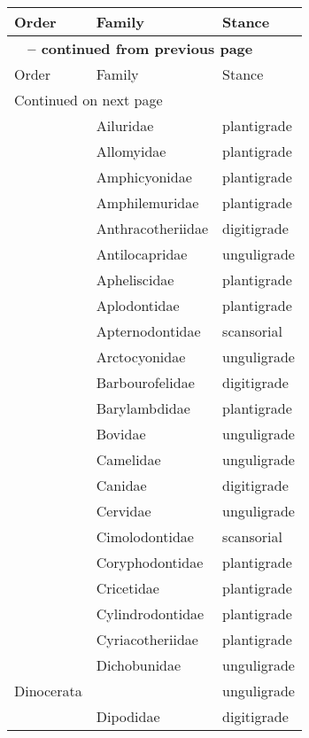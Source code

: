 
\begin{center}
  \begin{longtable}{ l l l }
    \hline Order & Family & Stance \\ \hline
    \endfirsthead
  
    \multicolumn{3}{p{\textwidth}}{{ \bfseries \tablename\ \thetable{} -- continued from previous page}} \\
    \hline Order & Family & Stance \\ \hline
    \endhead
      
    \hline \multicolumn{3}{p{\textwidth}}{{Continued on next page}} \\ \hline
    \endfoot
  
    \hline \hline
    \endlastfoot
  
    & Ailuridae & plantigrade \\ 
    & Allomyidae & plantigrade \\ 
    & Amphicyonidae & plantigrade \\ 
    & Amphilemuridae & plantigrade \\ 
    & Anthracotheriidae & digitigrade \\ 
    & Antilocapridae & unguligrade \\ 
    & Apheliscidae & plantigrade \\ 
    & Aplodontidae & plantigrade \\ 
    & Apternodontidae & scansorial \\ 
    & Arctocyonidae & unguligrade \\ 
    & Barbourofelidae & digitigrade \\ 
    & Barylambdidae & plantigrade \\ 
    & Bovidae & unguligrade \\ 
    & Camelidae & unguligrade \\ 
    & Canidae & digitigrade \\ 
    & Cervidae & unguligrade \\ 
    & Cimolodontidae & scansorial \\ 
    & Coryphodontidae & plantigrade \\ 
    & Cricetidae & plantigrade \\ 
    & Cylindrodontidae & plantigrade \\ 
    & Cyriacotheriidae & plantigrade \\ 
    & Dichobunidae & unguligrade \\ 
    Dinocerata &  & unguligrade \\ 
    & Dipodidae & digitigrade \\ 

\end{longtable}
\end{center}

